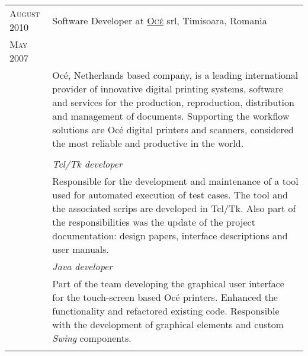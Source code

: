 \documentclass[a4paper,10pt]{article}
\begin{document}
\begin{longtable}{p{2.5cm}|p{11cm}}
 \raggedleft \textsc{August 2010} & Software Developer at \textsc{\href{http://www3.oce.com/ro/}{Oc\'e}} srl, Timisoara, Romania
 \\\raggedleft \textsc{May 2007}\\& 
 \footnotesize{Oc\'e, Netherlands based company, is a leading international
 provider of innovative digital printing systems, software
 and services for the production, reproduction, distribution and management of
 documents. Supporting the workflow solutions are Oc\'e digital  printers and
 scanners, considered the most reliable and productive in the world.}\\ \\ 
 &\emph{Tcl/Tk developer}\\
 &\footnotesize{Responsible for the development and maintenance of a tool
 used for automated execution of test cases. The tool and the associated scrips
 are developed in Tcl/Tk. Also part of the responsibilities was the update of
 the project documentation: design papers, interface descriptions and user
 manuals.}\\ 
 &\emph{Java developer}\\&\footnotesize{Part of the team developing the 
 graphical user interface for the touch-screen based Oc\'e printers. Enhanced
 the functionality and refactored existing code. Responsible with the development
 of graphical elements and custom \emph{Swing} components.} 
 \\\multicolumn{2}{c}{} \\ 
\end{longtable}

\end{document}
